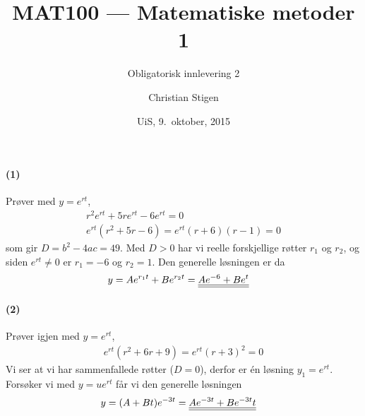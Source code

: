 \documentclass[a4paper,norsk,12pt]{article}
\title{MAT100 --- Matematiske metoder 1}
\subtitle{Obligatorisk innlevering 2}
\author{Christian Stigen}
\date{UiS, 9.~oktober, 2015}
\begin{document}
\maketitle

\paragraph{(1)} Prøver med $y=e^{rt}$,
\begin{equation*}
  \begin{split}
    r^2e^{rt} + 5re^{rt} - 6e^{rt} = 0 \\
    e^{rt}(r^2+5r-6) = e^{rt}(r+6)(r-1) = 0
  \end{split}
\end{equation*}
%
som gir $D = b^2 - 4ac = 49$. Med $D > 0$ har vi reelle forskjellige røtter
$r_1$ og $r_2$, og siden $e^{rt} \neq 0$ er $r_1=-6$ og $r_2=1$. Den generelle
løsningen er da
%
\begin{equation*}
  \begin{split}
    y & = Ae^{r_1t} + Be^{r_2t} = {\underline{\underline{Ae^{-6} + Be^t}}}
  \end{split}
\end{equation*}

\paragraph{(2)} Prøver igjen med $y=e^{rt}$,
\begin{equation*}
  \begin{split}
    e^{rt}(r^2 + 6r + 9) = e^{rt}(r+3)^2 = 0
  \end{split}
\end{equation*}
Vi ser at vi har sammenfallede røtter ($D=0$), derfor er én løsning $y_1 =
e^{rt}$. Forsøker vi med $y = ue^{rt}$ får vi den generelle løsningen
\begin{equation*}
  \begin{split}
    y & = (A + Bt)e^{-3t} = {\underline{\underline{Ae^{-3t} + Be^{-3t}t}}}
  \end{split}
\end{equation*}
\end{document}
